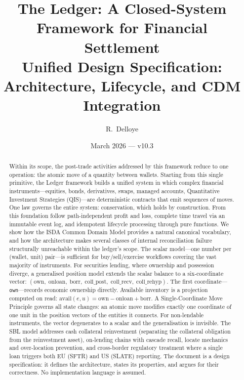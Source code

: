 \documentclass[11pt,a4paper]{article}
\title{The Ledger: A Closed-System Framework for Financial Settlement\\[6pt]
\large Unified Design Specification: Architecture, Lifecycle, and CDM Integration}
\author{R.\ Delloye}
\date{March 2026 --- v10.3}
\begin{document}
\maketitle

\begin{abstract}
Within its scope, the post-trade activities addressed by this framework reduce to one operation: the atomic move of a quantity between wallets. Starting from this single primitive, the Ledger framework builds a unified system in which complex financial instruments---equities, bonds, derivatives, swaps, managed accounts, Quantitative Investment Strategies (QIS)---are deterministic contracts that emit sequences of moves. One law governs the entire system: conservation, which holds by construction. From this foundation follow path-independent profit and loss, complete time travel via an immutable event log, and idempotent lifecycle processing through pure functions. We show how the ISDA Common Domain Model provides a natural canonical vocabulary, and how the architecture makes several classes of internal reconciliation failure structurally unreachable within the ledger's scope. The scalar model---one number per (wallet, unit) pair---is sufficient for buy/sell/exercise workflows covering the vast majority of instruments. For securities lending, where ownership and possession diverge, a generalised position model extends the scalar balance to a six-coordinate vector: $(\mathrm{own},\; \mathrm{onloan},\; \mathrm{borr},\; \mathrm{coll\_post},\; \mathrm{coll\_recv},\; \mathrm{coll\_rehyp})$. The first coordinate---\texttt{own}---records economic ownership directly. Available inventory is a projection computed on read: $\mathrm{avail}(e,u) = \mathrm{own} - \mathrm{onloan} + \mathrm{borr}$. A Single-Coordinate Move Principle governs all state changes: an atomic move modifies exactly one coordinate of one unit in the position vectors of the entities it connects. For non-lendable instruments, the vector degenerates to a scalar and the generalisation is invisible. The SBL model addresses cash collateral reinvestment (separating the collateral obligation from the reinvestment asset), on-lending chains with cascade recall, locate mechanics and over-location prevention, and cross-border regulatory treatment where a single loan triggers both EU (SFTR) and US (SLATE) reporting. The document is a design specification: it defines the architecture, states its properties, and argues for their correctness. No implementation language is assumed.
\end{abstract}
\end{document}
